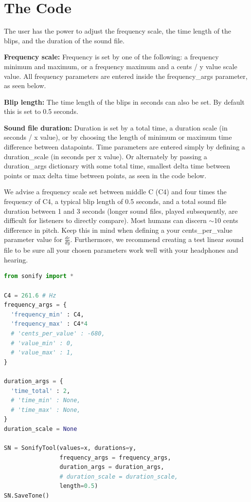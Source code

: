 \documentclass[]{acmsiggraph}
\begin{document}
\section{The Code}

The user has the power to adjust the frequency scale, the time length of the blips, and the duration of the sound file.

\textbf{Frequency scale:} Frequency is set by one of the following: a frequency minimum and maximum, or a frequency maximum and a cents / y value scale value. All frequency parameters are entered inside the frequency\_args parameter, as seen below.

\textbf{Blip length:} The time length of the blips in seconds can also be set. By default this is set to 0.5 seconds.

\textbf{Sound file duration:} Duration is set by a total time, a duration scale (in seconds / x value), or by choosing the length of minimum or maximum time difference between datapoints. Time parameters are entered simply by defining a duration\_scale (in seconds per x value). Or alternately by passing a duration\_args dictionary with some total time, smallest delta time between points or max delta time between points, as seen in the code below.


We advise a frequency scale set between middle C (C4) and four times the frequency of C4, a typical blip length of 0.5 seconds, and a total sound file duration between 1 and 3 seconds (longer sound files, played subsequently, are difficult for listeners to directly compare). Most humans can discern $\sim$10 cents difference in pitch. Keep this in mind when defining a your cents\_per\_value parameter value for $\frac{dc}{dy}$. Furthermore, we recommend creating a test linear sound file to be sure all your chosen parameters work well with your headphones and hearing.

\vspace{-1.25\baselineskip}
\begin{lstlisting}[language=Python, frame=lines,label={lst:code_direct}, caption={Example Code Setup.}, basicstyle=\footnotesize]
from sonify import *

C4 = 261.6 # Hz
frequency_args = {
  'frequency_min' : C4,
  'frequency_max' : C4*4
  # 'cents_per_value' : -680,
  # 'value_min' : 0,
  # 'value_max' : 1,
}

duration_args = {
  'time_total' : 2,
  # 'time_min' : None,
  # 'time_max' : None,
}
duration_scale = None

SN = SonifyTool(values=x, durations=y,
                frequency_args = frequency_args,
                duration_args = duration_args,
                # duration_scale = duration_scale,
                length=0.5)
SN.SaveTone()
\end{lstlisting}
\end{document}
